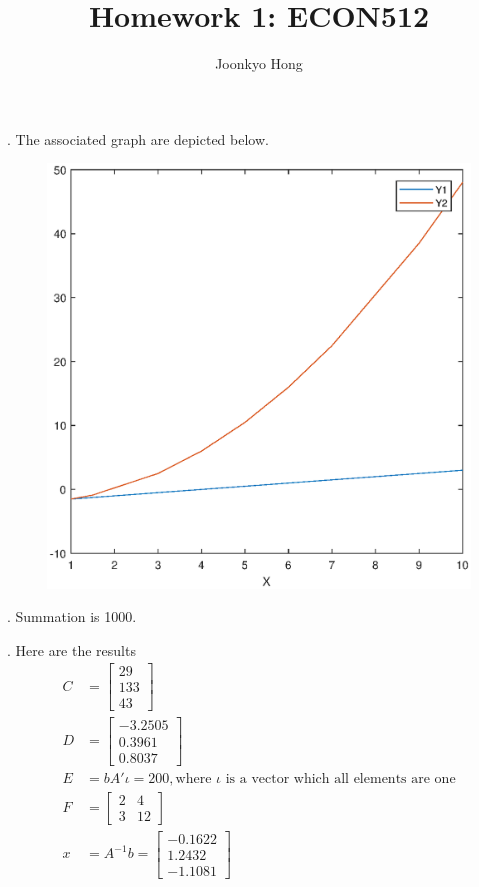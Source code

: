 \documentclass[11pt, letterpaper]{article}
\begin{document}
\title{Homework 1: ECON512}
\author{Joonkyo Hong}
\date{}
\maketitle
\smallskip

. The associated graph are depicted below.

\begin{figure}[!h]
\begin{center}
  \includegraphics[width=0.4\linewidth]{graph1.eps}
  \caption{}
  \label{fig:graph}
\end{center}
\end{figure}

. Summation is 1000.

. Here are the results 
\begin{align}
C & = \begin{bmatrix}
         29 \\ 133 \\ 43
      \end{bmatrix}    \nonumber \\
D & = \begin{bmatrix}
        -3.2505 \\ 0.3961 \\ 0.8037 
       \end{bmatrix}    \nonumber \\
E & = b A' \iota = 200, \text{where $\iota$ is a vector which all elements are one} \nonumber \\
F & = \begin{bmatrix}
          2 & 4 \\
          3 & 12 
      \end{bmatrix} \nonumber \\
x & = A^{-1}b = \begin{bmatrix}
                  -0.1622 \\ 1.2432 \\ -1.1081
                 \end{bmatrix} \nonumber 
\end{align}
\end{document}
